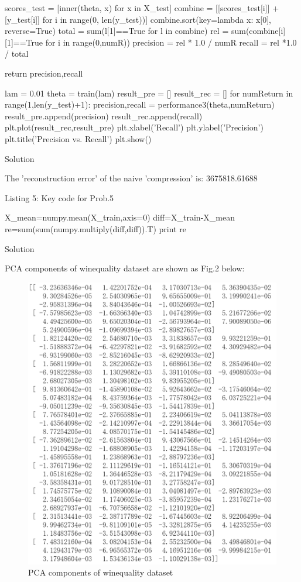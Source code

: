 \documentclass{assignment}
\begin{document}
\begin{problemlist}
\begin{python}
    scores_test = [inner(theta, x) for x in X_test]
    combine = [[scores_test[i]] + [y_test[i]] for i in range(0, len(y_test))]
    combine.sort(key=lambda x: x[0], reverse=True)
    total = sum(l[1]==True for l in combine)
    rel = sum(combine[i][1]==True for i in range(0,numR))
    precision = rel * 1.0 / numR
    recall = rel *1.0 / total

    return precision,recall


lam = 0.01
theta = train(lam)
result_pre = []
result_rec = []
for numReturn in range(1,len(y_test)+1):
    precision,recall = performance3(theta,numReturn)
    result_pre.append(precision)
    result_rec.append(recall)
plt.plot(result_rec,result_pre)
plt.xlabel('Recall')
plt.ylabel('Precision')
plt.title('Precision vs. Recall')
plt.show()
\end{python}

\pbitem Solution

The 'reconstruction error' of the naive 'compression' is: 3675818.61688 

\begin{center} 
Listing 5: Key code for Prob.5
\end{center}
\begin{python}
X_mean=numpy.mean(X_train,axis=0)
diff=X_train-X_mean
re=sum(sum(numpy.multiply(diff,diff)).T)
print re
\end{python}

\pbitem Solution
\vspace{2ex}

PCA components of winequality dataset are shown as Fig.2 below:
\begin{figure}[H]
\centering
\includegraphics[width=5in]{figure_6}
\caption{PCA components of winequality dataset}
\end{figure}


\end{problemlist}
\end{document}
